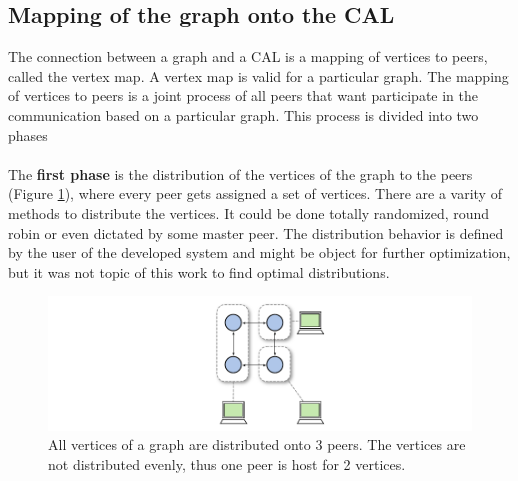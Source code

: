 \subsection{Mapping of the graph onto the CAL}
\label{sec:mapping}
The connection between a graph and a CAL is a mapping of vertices to
peers, called the vertex map.  A vertex map is valid for a particular
graph. The mapping of vertices to peers is a joint process of all
peers that want participate in the communication based on a particular
graph. This process is divided into two phases

\paragraph*{}
The \textbf{first phase} is the distribution of the vertices of the graph to
the peers (Figure \ref{fig:gvon_mapping}), where every peer gets
assigned a set of vertices. There are a varity of methods to
distribute the vertices.  It could be done totally randomized, round
robin or even dictated by some master peer. The distribution behavior
is defined by the user of the developed system and might be object for
further optimization, but it was not topic of this work to find optimal
distributions.

\begin{figure}[H]
  \centering \includegraphics[width=\textwidth]{graphics/30_gvon_mapping}
  \caption{All vertices of a graph are distributed onto 3 peers. The vertices
  are not distributed evenly, thus one peer is host for 2 vertices.}
  \label{fig:gvon_mapping}
\end{figure}

